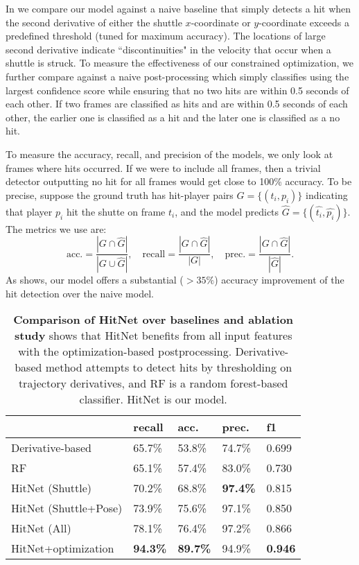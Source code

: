 In  we compare our model against a naive baseline that simply detects a hit when the second derivative of either the shuttle $x$-coordinate or $y$-coordinate exceeds a predefined threshold (tuned for maximum accuracy). The locations of large second derivative indicate ``discontinuities" in the velocity that occur when a shuttle is struck. To measure the effectiveness of our constrained optimization, we further compare against a naive post-processing which simply classifies using the largest confidence score while ensuring that no two hits are within 0.5 seconds of each other. If two frames are classified as hits and are within 0.5 seconds of each other, the earlier one is classified as a hit and the later one is classified as a no hit.

To measure the accuracy, recall, and precision of the models, we only look at frames where hits occurred. If we were to include all frames, then a trivial detector outputting no hit for all frames would get close to 100\% accuracy. To be precise, suppose the ground truth has hit-player pairs $G=\{(t_i, p_i)\}$ indicating that player $p_i$ hit the shutte on frame $t_i$, and the model predicts $\hat{G} = \{(\hat{t_i}, \hat{p_i})\}$. The metrics we use are:
\begin{equation*}
    \textrm{acc.} = \frac{|G \cap \hat{G}|}{|G \cup \hat{G}|}, \quad \textrm{recall} = \frac{|G \cap \hat{G}|}{|G|}, \quad \textrm{prec.} = \frac{|G \cap \hat{G}|}{|\hat{G}|}.
\end{equation*}
As  shows, our model offers a substantial ($>35\%$) accuracy improvement of the hit detection over the naive model.




\begin{table}[t]
\caption{{\bf Comparison of HitNet over baselines and ablation study} shows that HitNet benefits from all input features with the optimization-based postprocessing. Derivative-based method attempts to detect hits by thresholding on trajectory derivatives, and RF is a random forest-based classifier. HitNet is our model. \label{tab:hit-detection}}
\centering
\begin{tabular}{l|llll}
\toprule
           & recall & acc. & prec. & f1 \\ 
\hline
Derivative-based     & 65.7\%       & 53.8\%       & 74.7\%        & 0.699 \\ 
\hline
RF                   & 65.1\%       & 57.4\%       & 83.0\%        & 0.730 \\
\hline
HitNet (Shuttle)      & 70.2\%      & 68.8\%       & {\bf 97.4\%}  & 0.815 \\
HitNet (Shuttle+Pose) & 73.9\%      & 75.6\%       & 97.1\%  & 0.850 \\
HitNet (All)          & 78.1\%      & 76.4\%       & 97.2\%  & 0.866 \\
\hline
HitNet+optimization  & {\bf 94.3\%} & {\bf 89.7\%} & 94.9\%        & {\bf 0.946} \\
\bottomrule
\end{tabular}
\end{table}


